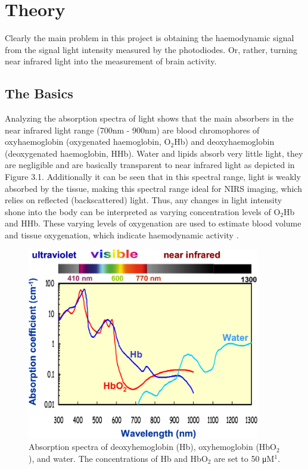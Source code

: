 \chapter{Theory}

Clearly the main problem in this project is obtaining the haemodynamic signal from the signal light intensity measured by the photodiodes. Or, rather, turning near infrared light into the measurement of brain activity.

\section{The Basics}

Analyzing the absorption spectra of light shows that the main absorbers in the near infrared light range (700nm - 900nm) are blood chromophores of oxyhaemoglobin (oxygenated haemoglobin, O$_{2}$Hb) and deoxyhaemoglobin (deoxygenated haemoglobin, HHb). Water and lipids absorb very little light, they are negligible and are basically transparent to near infrared light as depicted in Figure 3.1. Additionally it can be seen that in this spectral range, light is weakly absorbed by the tissue, making this spectral range ideal for NIRS imaging, which relies on reflected (backscattered) light. Thus, any changes in light intensity shone into the body can be interpreted as varying concentration levels of O$_{2}$Hb and HHb. These varying levels of oxygenation are used to estimate blood volume and tissue oxygenation, which indicate haemodynamic activity \cite{rosen05}.

\begin{figure}[htp]
\centering
\includegraphics[width=4in]{spectra.png}
\caption[Propagation of photons]{Absorption spectra of deoxyhemoglobin (Hb), oxyhemoglobin (HbO$_2$), and water. The concentrations of Hb and HbO$_2$ are set to 50 μM$^1$.}
\end{figure}

